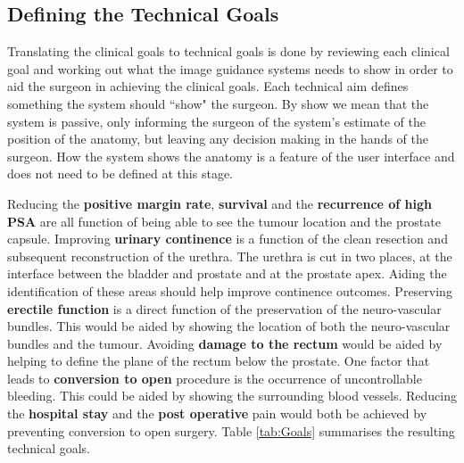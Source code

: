 \documentclass[3p,twocolumn,preprint,10pt]{elsarticle}
\begin{document}
\subsection{Defining the Technical Goals}
Translating the clinical goals to technical goals is done by 
reviewing each clinical goal and working out what the 
image guidance systems needs to show in order to aid the surgeon 
in achieving the clinical goals. Each technical aim defines
something the system should ``show" the surgeon. By 
show we mean that the system is passive, only 
informing the surgeon of the system's estimate of 
the position of the anatomy, but leaving any decision 
making in the hands of the surgeon. How the system shows the 
anatomy is a feature of the user interface and does not 
need to be defined at this stage.  

Reducing the {\bf positive margin rate}, {\bf survival} 
and the {\bf recurrence of high PSA}
are all function of being able to see the tumour location and the 
prostate capsule. Improving {\bf urinary continence} is a function of 
the clean resection and subsequent reconstruction of the urethra. 
The urethra is cut in two places, at the interface between the
bladder and prostate and at the prostate apex. Aiding the identification 
of these areas should help improve continence outcomes.
Preserving {\bf erectile function} is a direct function of 
the preservation of the neuro-vascular bundles. This would be
aided by showing the location of both the neuro-vascular bundles and
the tumour.
Avoiding {\bf damage to the rectum} would be aided by helping to 
define the plane of the rectum below the prostate. 
One factor that leads to {\bf conversion to open} procedure is the occurrence 
of uncontrollable bleeding. This could be aided by showing 
the surrounding blood vessels. Reducing the {\bf hospital stay} and the 
{\bf post operative} pain would both be achieved by preventing 
conversion to open surgery.
Table \ref{tab:Goals} summarises the resulting technical goals.
\end{document}
